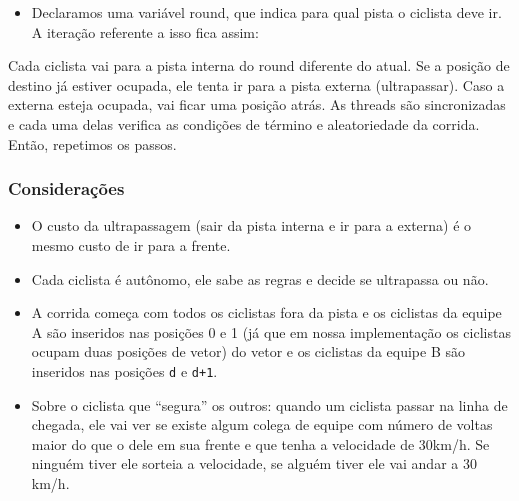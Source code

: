 \documentclass{beamer}
\begin{document}
\begin{frame}
\begin{itemize}
	\item Declaramos uma variável round, que indica para qual pista o ciclista deve ir. A iteração referente a isso fica assim:
\end{itemize}
\begin{block}{}
	Cada ciclista vai para a pista interna do round diferente do atual. Se a posição de destino já estiver ocupada, ele tenta ir para a pista externa (ultrapassar). Caso a externa esteja ocupada, vai ficar uma posição atrás. As threads são sincronizadas e cada uma delas verifica as condições de término e aleatoriedade da corrida. Então, repetimos os passos.
\end{block}
\end{frame}

\begin{frame}
\frametitle{Considerações}
\begin{itemize}
	\item O custo da ultrapassagem (sair da pista interna e ir para a externa) é o mesmo custo de ir para a frente.
	\item Cada ciclista é autônomo, ele sabe as regras e decide se ultrapassa ou não.
	\item A corrida começa com todos os ciclistas fora da pista e os ciclistas da equipe A são inseridos nas posições 0 e 1 (já que em nossa implementação os ciclistas ocupam duas posições de vetor) do vetor e os ciclistas da equipe B são inseridos nas posições \texttt{d} e \texttt{d+1}.
	\item Sobre o ciclista que “segura” os outros:  quando um ciclista passar na linha de chegada, ele vai ver se existe algum colega de equipe com número de voltas maior do que o dele em sua frente e que tenha a velocidade de 30km/h.  Se ninguém tiver ele sorteia a velocidade, se alguém tiver ele vai andar a 30 km/h.
	
\end{itemize}
\end{frame}
\end{document}
